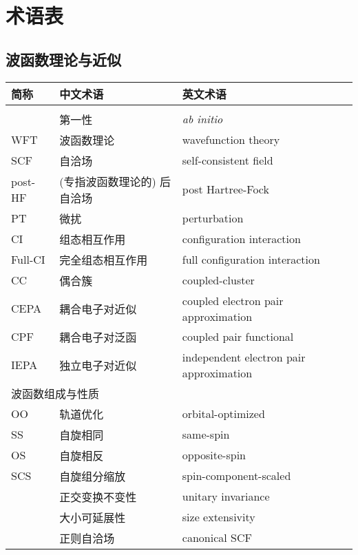 
\chapter{术语表}

\section*{波函数理论与近似}

\begingroup
\setlength{\LTleft}{-20cm plus -1fill}
\setlength{\LTright}{\LTleft}

\begin{longtable}{lll}
    \toprule 简称 & 中文术语 & 英文术语 \\ \midrule \endhead
    \bottomrule \endlastfoot
    \multicolumn{3}{l}{\textsf{波函数理论}} \\
    & 第一性 & \emph{ab initio} \\
    WFT & 波函数理论 & wavefunction theory \\
    SCF & 自洽场 & self-consistent field \\
    post-HF & (专指波函数理论的) 后自洽场 & post Hartree-Fock \\
    PT & 微扰 & perturbation \\
    CI & 组态相互作用 & configuration interaction \\
    Full-CI & 完全组态相互作用 & full configuration interaction \\
    CC & 偶合簇 & coupled-cluster \\
    CEPA & 耦合电子对近似 & coupled electron pair approximation \\
    CPF & 耦合电子对泛函 & coupled pair functional \\
    IEPA & 独立电子对近似 & independent electron pair approximation \\
    \midrule
    \multicolumn{3}{l}{\textsf{波函数组成与性质}} \\
    OO & 轨道优化 & orbital-optimized \\
    SS & 自旋相同 & same-spin \\
    OS & 自旋相反 & opposite-spin \\
    SCS & 自旋组分缩放 & spin-component-scaled \\
    & 正交变换不变性 & unitary invariance \\
    & 大小可延展性 & size extensivity \\
    & 正则自洽场 & canonical SCF \\

\end{longtable}
